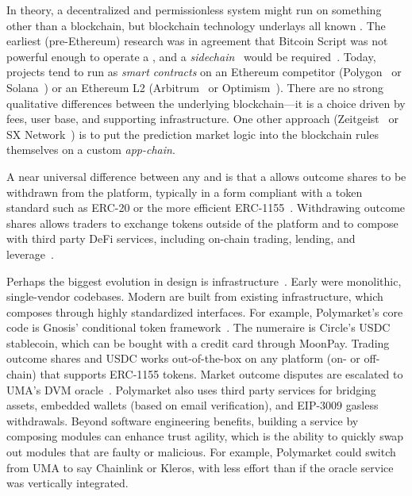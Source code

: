In theory, a decentralized and permissionless system might run on something other than a blockchain, but blockchain technology underlays all known \depms. The earliest (pre-Ethereum) research was in agreement that Bitcoin Script was not powerful enough to operate a \depm, and a \textit{sidechain}~\cite{BCD+14} would be required~\cite{Sz14,BCFKMN14}. Today, projects tend to run as \textit{smart contracts} on an Ethereum competitor (\eg Polygon~\cite{AKN21} or Solana~\cite{Yak18}) or an Ethereum L2 (\eg Arbitrum~\cite{KGCWF18} or Optimism~\cite{op}). There are no strong qualitative differences between the underlying blockchain---it is a choice driven by fees, user base, and supporting infrastructure. One other approach (\eg Zeitgeist~\cite{zeit} or SX Network~\cite{sx}) is to put the prediction market logic into the blockchain rules themselves on a custom \textit{app-chain}.

A near universal difference between any \cepm and \depm is that a \depm allows outcome shares to be withdrawn from the platform, typically in a form compliant with a token standard such as ERC-20 or the more efficient ERC-1155~\cite{LDBR24}. Withdrawing outcome shares allows traders to exchange tokens outside of the platform and to compose with third party DeFi services, including on-chain trading, lending, and leverage~\cite{WPG+22}.

Perhaps the biggest evolution in \depm design is infrastructure~\cite{Gun24}. Early \depms were monolithic, single-vendor codebases. Modern \depms are built from existing infrastructure, which composes through highly standardized interfaces. For example, Polymarket's core \depm code is Gnosis' conditional token framework~\cite{ctf}. The numeraire is Circle's USDC stablecoin, which can be bought with a credit card through MoonPay. Trading outcome shares and USDC works out-of-the-box on any platform (on- or off-chain) that supports ERC-1155 tokens. Market outcome disputes are escalated to UMA's DVM oracle~\cite{uma}. Polymarket also uses third party services for bridging assets, embedded wallets (based on email verification), and EIP-3009 gasless withdrawals. Beyond software engineering benefits, building a service by composing modules can enhance trust agility, which is the ability to quickly swap out modules that are faulty or malicious. For example, Polymarket could switch from UMA to say Chainlink or Kleros, with less effort than if the oracle service was vertically integrated. 



